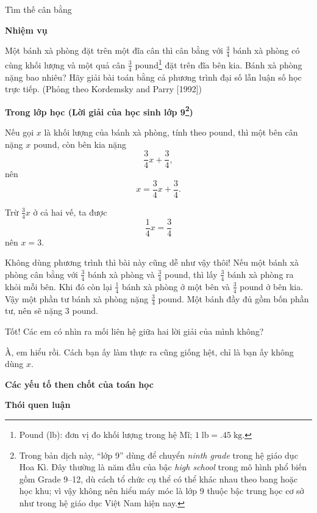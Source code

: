   {
    Tìm thế cân bằng
  }
  {
    \textbf{Nhiệm vụ}

    Một bánh xà phòng đặt trên một đĩa cân thì cân bằng với $\frac{3}{4}$ bánh xà phòng có cùng khối lượng và một quả cân $\frac{3}{4}$ pound\footnote{Pound (lb): đơn vị đo khối lượng trong hệ Mĩ; $1\;\text{lb}=.45\;\text{kg}$.} đặt trên đĩa bên kia. Bánh xà phòng nặng bao nhiêu? Hãy giải bài toán bằng cả phương trình đại số lẫn luận số học trực tiếp. (Phỏng theo Kordemsky and Parry [1992])

    \textbf{Trong lớp học (Lời giải của học sinh lớp 9\footnote{Trong bản dịch này, ``lớp 9'' dùng để chuyển \emph{ninth grade} trong hệ giáo dục Hoa Kì. Đây thường là năm đầu của bậc \emph{high school} trong mô hình phổ biến gồm Grade 9--12, dù cách tổ chức cụ thể có thể khác nhau theo bang hoặc học khu; vì vậy không nên hiểu máy móc là lớp 9 thuộc bậc trung học cơ sở như trong hệ giáo dục Việt Nam hiện nay.})}

    \begin{scriptlist}
    \item [Học sinh 1:] Nếu gọi $x$ là khối lượng của bánh xà phòng, tính theo pound, thì một bên cân nặng $x$ pound, còn bên kia nặng
    $$
    \frac{3}{4}x+\frac{3}{4},
    $$
    nên
    $$
    x=\frac{3}{4}x+\frac{3}{4}.
    $$

    Trừ $\frac{3}{4}x$ ở cả hai vế, ta được
    $$
    \frac{1}{4}x=\frac{3}{4}
    $$
    nên $x=3$.

    \item [Học sinh 2:] Không dùng phương trình thì bài này cũng dễ như vậy thôi! Nếu một bánh xà phòng cân bằng với $\frac{3}{4}$ bánh xà phòng và $\frac{3}{4}$ pound, thì lấy $\frac{3}{4}$ bánh xà phòng ra khỏi mỗi bên. Khi đó còn lại $\frac{1}{4}$ bánh xà phòng ở một bên và $\frac{3}{4}$ pound ở bên kia. Vậy một phần tư bánh xà phòng nặng $\frac{3}{4}$ pound. Một bánh đầy đủ gồm bốn phần tư, nên sẽ nặng $3$ pound.
    
    \item [Giáo viên:] Tốt! Các em có nhìn ra mối liên hệ giữa hai lời giải của mình không?
    
    \item [Học sinh 1:] À, em hiểu rồi. Cách bạn ấy làm thực ra cũng giống hệt, chỉ là bạn ấy không dùng $x$.
    \end{scriptlist}

    \noindent\textbf{Các yếu tố then chốt của toán học}

    \begin{hanglist}
      \vspace{\baselineskip}
    \end{hanglist}

    \noindent\textbf{Thói quen luận}

    \begin{hanglist}
      \vspace{\baselineskip}

    \end{hanglist}
  }{}

